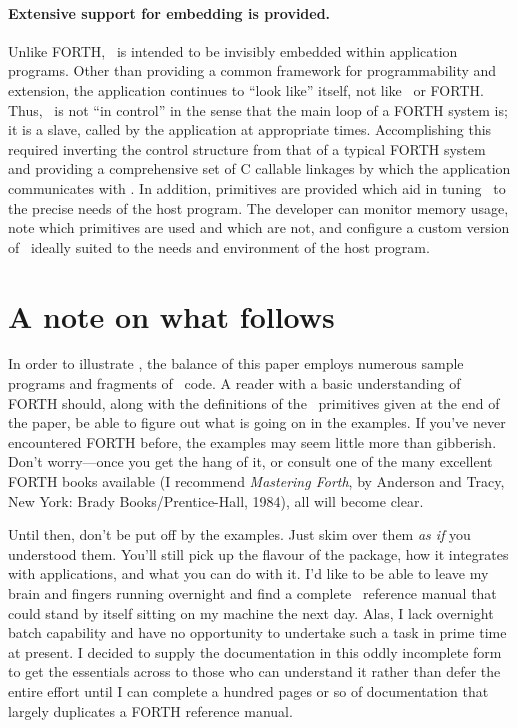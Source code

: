\documentclass[twocolumn]{article}
\begin{document}
\paragraph{Extensive support for embedding is provided.}  Unlike
FORTH, \atlast\ is intended to be invisibly embedded within application
programs.  Other than providing a common framework for programmability
and extension, the application continues to ``look like'' itself, not
like \atlast\ or FORTH\@.  Thus, \atlast\ is not ``in control'' in the
sense that the main loop of a FORTH system is; it is a slave, called
by the application at appropriate times.  Accomplishing this required
inverting the control structure from that of a typical FORTH system
and providing a comprehensive set of C callable linkages by which the
application communicates with \atlast .  In addition, primitives are
provided which aid in tuning \atlast\ to the precise needs of the host
program.  The developer can monitor memory usage, note which
primitives are used and which are not, and configure a custom version
of \atlast\ ideally suited to the needs and environment of the host
program.

\section{A note on what follows}

In order to illustrate \atlast , the balance of this paper employs
numerous sample programs and fragments of \atlast\ code.  A reader with
a basic understanding of FORTH should, along with the definitions of
the \atlast\ primitives given at the end of the paper, be able to
figure out what is going on in the examples.  If you've never
encountered FORTH before, the examples may seem little more than
gibberish.  Don't worry---once you get the hang of it, or consult one
of the many excellent FORTH books available (I recommend {\sl
Mastering Forth}, by Anderson and Tracy, New York: Brady
Books/Prentice-Hall, 1984), all will become clear.

Until then, don't be put off by the examples.  Just skim over them
{\em as if\/} you understood them.  You'll still pick up the flavour
of the package, how it integrates with applications, and what you can
do with it.  I'd like to be able to leave my brain and fingers running
overnight and find a complete \atlast\ reference manual that could
stand by itself sitting on my machine the next day.  Alas, I lack
overnight batch capability and have no opportunity to undertake such a
task in prime time at present.  I decided to supply the documentation
in this oddly incomplete form to get the essentials across to those
who can understand it rather than defer the entire effort until I can
complete a hundred pages or so of documentation that largely
duplicates a FORTH reference manual.
\end{document}
